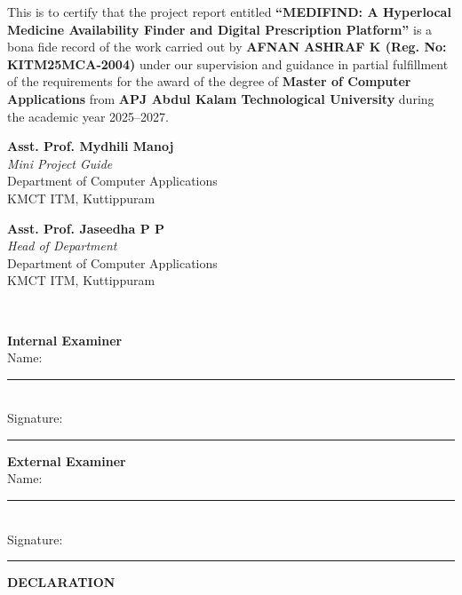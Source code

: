 \documentclass[12pt,a4paper]{report}
\begin{document}
\noindent This is to certify that the project report entitled \textbf{``MEDIFIND: A Hyperlocal Medicine Availability Finder and Digital Prescription Platform''} is a bona fide record of the work carried out by \textbf{AFNAN ASHRAF K (Reg. No: KITM25MCA-2004)} under our supervision and guidance in partial fulfillment of the requirements for the award of the degree of \textbf{Master of Computer Applications} from \textbf{APJ Abdul Kalam Technological University} during the academic year 2025--2027.\\[2.5cm]

\noindent
\begin{minipage}[t]{0.48\textwidth}
    \textbf{Asst. Prof. Mydhili Manoj}\\
    \textit{Mini Project Guide}\\
    Department of Computer Applications\\
    KMCT ITM, Kuttippuram
\end{minipage}
\hfill
\begin{minipage}[t]{0.48\textwidth}
    \textbf{Asst. Prof. Jaseedha P P}\\
    \textit{Head of Department}\\
    Department of Computer Applications\\
    KMCT ITM, Kuttippuram
\end{minipage}\\[3.0cm]

\noindent
\begin{minipage}[t]{0.48\textwidth}
    \textbf{Internal Examiner}\\
    Name: \rule{4.5cm}{0.4pt}\\[0.2cm]
    Signature: \rule{4.0cm}{0.4pt}
\end{minipage}
\hfill
\begin{minipage}[t]{0.48\textwidth}
    \textbf{External Examiner}\\
    Name: \rule{4.5cm}{0.4pt}\\[0.2cm]
    Signature: \rule{4.0cm}{0.4pt}
\end{minipage}

\newpage
\thispagestyle{plain}
\begin{center}
    {\Large \textbf{DECLARATION}}\\[1.0cm]
\end{center}
\end{document}
